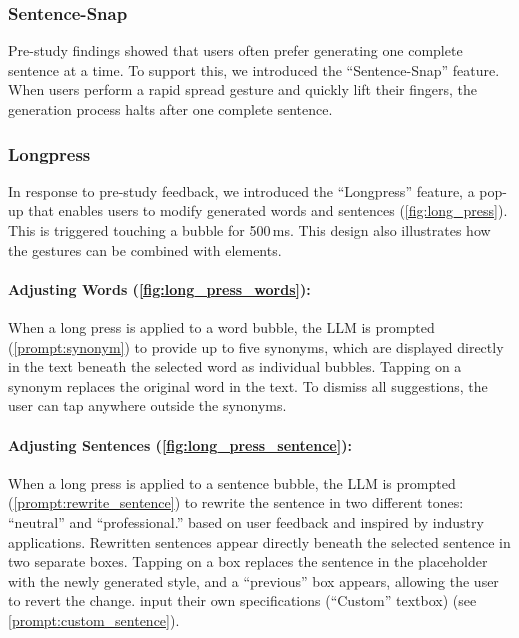 \subsubsection{Sentence-Snap}
Pre-study findings showed that users often prefer generating one complete sentence at a time. 
To support this, we introduced the ``Sentence-Snap'' feature. 
When users perform a rapid spread gesture and quickly lift their fingers, the generation process halts after one complete sentence. 

\subsubsection{Longpress}
\label{sec:longpress}
In response to pre-study feedback, we introduced the ``Longpress'' feature, a pop-up that enables users to modify generated words and sentences (\cref{fig:long_press}). 
This is triggered  touching a bubble for 500\,ms. %
This design also illustrates how the gestures can be combined with  elements.


     

\paragraph{Adjusting Words (\cref{fig:long_press_words}):} When a long press is applied to a word bubble, the LLM is prompted (\cref{prompt:synonym}) to provide up to five synonyms, which are displayed directly in the text beneath the selected word as individual bubbles. 
Tapping on a synonym replaces the original word in the text. 
To dismiss all suggestions, the user can tap anywhere outside the synonyms.

\paragraph{Adjusting Sentences (\cref{fig:long_press_sentence}):} When a long press is applied to a sentence bubble, the LLM is prompted (\cref{prompt:rewrite_sentence}) to rewrite the sentence in two different tones: ``neutral'' and ``professional.''  based on user feedback and inspired by industry applications. 
Rewritten sentences appear directly beneath the selected sentence in two separate boxes.
Tapping on a box replaces the sentence in the placeholder with the newly generated style, and a ``previous'' box appears, allowing the user to revert the change. 
 input their own specifications (``Custom'' textbox)  (see \cref{prompt:custom_sentence}). 

